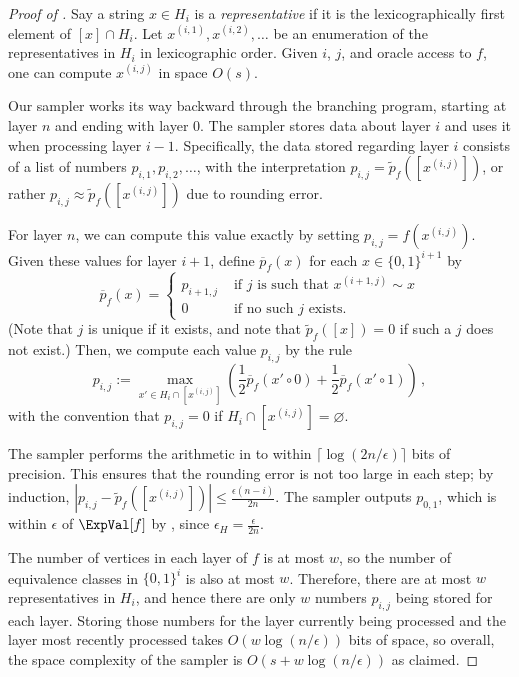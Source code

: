 \begin{proof}[Proof of ]
Say a string $x \in H_i$ is a \emph{representative} if it is the lexicographically first element of $[x] \cap H_i$. Let $x^{(i, 1)}, x^{(i, 2)}, \dots$ be an enumeration of the representatives in $H_i$ in lexicographic order. Given $i$, $j$, and oracle access to $f$, one can compute $x^{(i, j)}$ in space $O(s)$.

Our sampler works its way backward through the branching program, starting at layer $n$ and ending with layer $0$. The sampler stores data about layer $i$ and uses it when processing layer $i - 1$. Specifically, the data stored regarding layer $i$ consists of a list of numbers $p_{i, 1}, p_{i, 2}, \dots$, with the interpretation $p_{i, j} = \widetilde{p}_f([x^{(i, j)}])$, or rather $p_{i, j} \approx \widetilde{p}_f([x^{(i, j)}])$ due to rounding error.

For layer $n$, we can compute this value exactly by setting $p_{i, j} = f(x^{(i, j)})$. 
Given these values for layer $i + 1$, define $\overline{p}_f(x)$ for each $x \in \{0, 1\}^{i + 1}$ by
\[
\overline{p}_f(x) = \begin{cases}
p_{i + 1, j} & \text{ if $j$ is such that $x^{(i + 1, j)} \sim x$} \\
0 & \text{ if no such $j$ exists.}
\end{cases}
\]
(Note that $j$ is unique if it exists, and note that $\widetilde{p}_f([x]) = 0$ if such a $j$ does not exist.) Then, we compute each value $p_{i, j}$ by the rule
\begin{equation} \label{eqn:pij}
p_{i, j} := \max_{x' \in H_i \cap [x^{(i, j)}]} \left(\frac{1}{2} \overline{p}_f(x' \circ 0) + \frac{1}{2} \overline{p}_f(x' \circ 1)\right)\,,
\end{equation}
with the convention that $p_{i, j} = 0$ if $H_i \cap [x^{(i, j)}] = \varnothing$.

The sampler performs the arithmetic in  to within $\lceil \log(2n/\epsilon)\rceil$ bits of precision. This ensures that the rounding error is not too large in each step; by induction, $|p_{i, j} - \widetilde{p}_f([x^{(i, j)}])| \leq \frac{\epsilon (n - i)}{2n}$. The sampler outputs $p_{0, 1}$, which is within $\epsilon$ of $\ExpVal[f]$ by , since $\epsilon_H = \frac{\epsilon}{2n}$.

The number of vertices in each layer of $f$ is at most $w$, so the number of equivalence classes in $\{0, 1\}^i$ is also at most $w$. Therefore, there are at most $w$ representatives in $H_i$, and hence there are only $w$ numbers $p_{i, j}$ being stored for each layer. Storing those numbers for the layer currently being processed and the layer most recently processed takes $O(w \log(n/\epsilon))$ bits of space, so overall, the space complexity of the sampler is $O(s + w \log(n/\epsilon))$ as claimed.
\end{proof}

